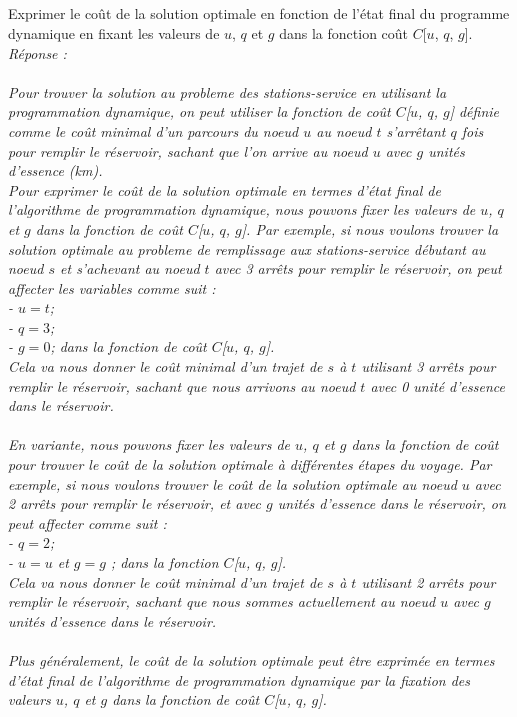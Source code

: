 \documentclass[a4paper,11pt]{article}
\begin{document}
        \subsection{}\label{subsec:Q3}
        Exprimer le coût de la solution optimale en fonction de l’état final du programme dynamique en
fixant les valeurs de $u$, $q$ et $g$ dans la fonction coût $C$[$u$, $q$, $g$].\\\textit{Réponse : \\\\
            Pour trouver la solution au probleme des stations-service en utilisant la programmation dynamique, on peut utiliser la fonction de coût $C$[$u$, $q$, $g$] définie comme le coût minimal d'un parcours du noeud $u$ au noeud $t$ s'arrêtant $q$ fois pour remplir le réservoir, sachant que l'on arrive au noeud $u$ avec $g$ unités d'essence (km).\\
Pour exprimer le coût de la solution optimale en termes d'état final de l'algorithme de programmation dynamique, nous pouvons fixer les valeurs de $u$, $q$ et $g$ dans la fonction de coût $C$[$u$, $q$, $g$]. Par exemple, si nous voulons trouver la solution optimale au probleme de remplissage aux stations-service débutant au noeud $s$ et s'achevant au noeud $t$ avec 3 arrêts pour remplir le réservoir, on peut affecter les variables comme suit :\\
- $u = t$;\\
- $q = 3$;\\
- $g = 0$;
dans la fonction de coût $C$[$u$, $q$, $g$].\\ Cela va nous donner le coût minimal d'un trajet de $s$ à $t$ utilisant 3 arrêts pour remplir le réservoir, sachant que nous arrivons au noeud $t$ avec 0 unité d'essence dans le réservoir.\\\\
En variante, nous pouvons fixer les valeurs de $u$, $q$ et $g$ dans la fonction de coût pour trouver le coût de la solution optimale à différentes étapes du voyage. Par exemple, si nous voulons trouver le coût de la solution optimale au noeud $u$ avec 2 arrêts pour remplir le réservoir, et avec $g$ unités d'essence dans le réservoir, on peut affecter comme suit :\\
- $q = 2$;\\- $u = u$ et $g = g$ ; dans la fonction $C$[$u$, $q$, $g$].\\ Cela va nous donner le coût minimal d'un trajet de $s$ à $t$ utilisant 2 arrêts pour remplir le réservoir, sachant que nous sommes actuellement au noeud $u$ avec $g$ unités d'essence dans le réservoir.\\\\
Plus généralement, le coût de la solution optimale peut être exprimée en termes d'état final de l'algorithme de programmation dynamique par la fixation des valeurs $u$, $q$ et $g$ dans la fonction de coût $C$[$u$, $q$, $g$].}
\end{document}
